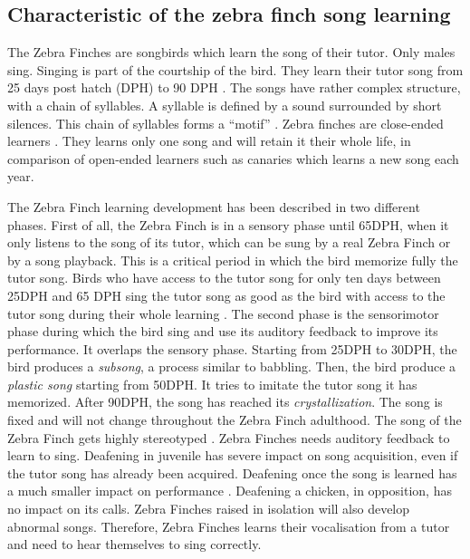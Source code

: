 \documentclass{report}
\begin{document}
\subsection{Characteristic of the zebra finch song
learning}\label{characteristic-of-zebra-finch-song-learning}


The Zebra Finches are songbirds which learn the song of their tutor. Only males
sing. Singing is part of the courtship of the bird. They learn their tutor song
from 25 days post hatch (DPH) to 90 DPH \parencite{liu_juvenile_2004}. The songs
have rather complex structure, with a chain of syllables. A syllable is defined
by a sound surrounded by short silences. This chain of syllables forms a
``motif'' \parencite{doupe_birdsong_1999, margoliash_evaluating_2002}. Zebra
finches are close-ended learners \parencite{margoliash_sleep_2010}. They learns
only one song and will retain it their whole life, in comparison of open-ended
learners such as canaries which learns a new song each year.

The Zebra Finch learning development has been described in two different phases.
First of all, the Zebra Finch is in a sensory phase until 65DPH, when it only
listens to the song of its tutor, which can be sung by a real Zebra Finch or by
a song playback. This is a critical period in which the bird memorize fully the
tutor song. Birds who have access to the tutor song for only ten days between
25DPH and 65 DPH sing the tutor song as good as the bird with access to the
tutor song during their whole learning \parencite{bohner_early_1990,
roper_onset_2006}. The second phase is the sensorimotor phase during which the
bird sing and use its auditory feedback to improve its performance. It overlaps
the sensory phase. Starting from 25DPH to 30DPH, the bird produces a
\emph{subsong}, a process similar to babbling. Then, the bird produce a
\emph{plastic song} starting from 50DPH. It tries to imitate the tutor song it
has memorized. After 90DPH, the song has reached its \emph{crystallization}. The
song is fixed and will not change throughout the Zebra Finch adulthood. The song
of the Zebra Finch gets highly stereotyped \parencite{williams_birdsong_2004}.
Zebra Finches needs auditory feedback to learn to sing. Deafening in juvenile
has severe impact on song acquisition, even if the tutor song has already been
acquired. Deafening once the song is learned has a much smaller impact on
performance \parencite{scharff_comparative_1991, doupe_birdsong_1999}. Deafening
a chicken, in opposition, has no impact on its calls. Zebra Finches raised in
isolation will also develop abnormal songs. Therefore, Zebra Finches learns
their vocalisation from a tutor and need to hear themselves to sing correctly.
\end{document}
